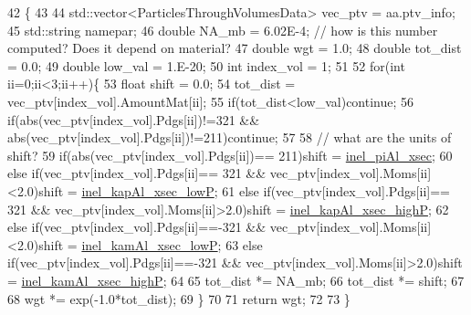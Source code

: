 \begin{DoxyCode}
42                                                                                 \{
43     
44     std::vector<ParticlesThroughVolumesData>  vec\_ptv = aa.ptv\_info;
45     std::string namepar;
46     \textcolor{keywordtype}{double} NA\_mb    = 6.02E-4; \textcolor{comment}{// how is this number computed? Does it depend on material?}
47     \textcolor{keywordtype}{double} wgt      = 1.0;
48     \textcolor{keywordtype}{double} tot\_dist = 0.0;
49     \textcolor{keywordtype}{double} low\_val  = 1.E-20;   
50     \textcolor{keywordtype}{int} index\_vol   = 1;
51     
52     \textcolor{keywordflow}{for}(\textcolor{keywordtype}{int} ii=0;ii<3;ii++)\{
53       \textcolor{keywordtype}{float} shift = 0.0;
54       tot\_dist = vec\_ptv[index\_vol].AmountMat[ii];
55       \textcolor{keywordflow}{if}(tot\_dist<low\_val)\textcolor{keywordflow}{continue};
56       \textcolor{keywordflow}{if}(abs(vec\_ptv[index\_vol].Pdgs[ii])!=321 && abs(vec\_ptv[index\_vol].Pdgs[ii])!=211)\textcolor{keywordflow}{continue};
57       
58       \textcolor{comment}{// what are the units of shift?}
59       \textcolor{keywordflow}{if}(abs(vec\_ptv[index\_vol].Pdgs[ii])== 211)shift = \hyperlink{class_neutrino_flux_reweight_1_1_absorption_d_p_i_p_reweighter_af745299f29459ca26ac57b9bae817bdb}{inel\_piAl\_xsec};
60       \textcolor{keywordflow}{else} \textcolor{keywordflow}{if}(vec\_ptv[index\_vol].Pdgs[ii]== 321 && vec\_ptv[index\_vol].Moms[ii]<2.0)shift = 
      \hyperlink{class_neutrino_flux_reweight_1_1_absorption_d_p_i_p_reweighter_a7035ed9b51c4053c042dd791bbe837d6}{inel\_kapAl\_xsec\_lowP};
61       \textcolor{keywordflow}{else} \textcolor{keywordflow}{if}(vec\_ptv[index\_vol].Pdgs[ii]== 321 && vec\_ptv[index\_vol].Moms[ii]>2.0)shift = 
      \hyperlink{class_neutrino_flux_reweight_1_1_absorption_d_p_i_p_reweighter_a4c5d6fe2c15175a60e2641ae1c714408}{inel\_kapAl\_xsec\_highP};
62       \textcolor{keywordflow}{else} \textcolor{keywordflow}{if}(vec\_ptv[index\_vol].Pdgs[ii]==-321 && vec\_ptv[index\_vol].Moms[ii]<2.0)shift = 
      \hyperlink{class_neutrino_flux_reweight_1_1_absorption_d_p_i_p_reweighter_a3cef22dec7205f0331beb41c2eb35238}{inel\_kamAl\_xsec\_lowP};
63       \textcolor{keywordflow}{else} \textcolor{keywordflow}{if}(vec\_ptv[index\_vol].Pdgs[ii]==-321 && vec\_ptv[index\_vol].Moms[ii]>2.0)shift = 
      \hyperlink{class_neutrino_flux_reweight_1_1_absorption_d_p_i_p_reweighter_a97ba47996c1cae70e4374d8856fdb4cd}{inel\_kamAl\_xsec\_highP};
64       
65       tot\_dist *= NA\_mb;
66       tot\_dist *= shift;
67       
68       wgt *= exp(-1.0*tot\_dist);   
69     \}
70     
71     \textcolor{keywordflow}{return} wgt;
72 
73   \}
\end{DoxyCode}
